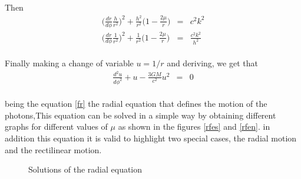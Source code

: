 \documentclass[letterpaper,11pt,onecolumn]{article}
\begin{document}
Then
\begin{eqnarray}
    \Big(\frac{dr}{d\phi}\frac{h}{r^{2}}\Big)^{2}+\frac{h^2}{r^{2}}\Big( 1- \frac{2\mu}{r}\Big)&=& c^{2}k^{2} \nonumber\\
    \Big(\frac{dr}{d\phi}\frac{1}{r^{2}}\Big)^{2}+\frac{1}{r^{2}}\Big( 1- \frac{2\mu}{r}\Big)&=&\frac{c^{2}k^{2}}{h^{2}}\label{aste} 
\end{eqnarray}\\
Finally making a change of variable $u=1/r$ and deriving, we get that
\begin{eqnarray}
    \frac{d^{2}u}{d\phi^{2}}+u-\frac{3GM}{c^{2}}u^{2}&=&0 \label{fr}
\end{eqnarray}\\ 
being the equation \ref{fr} the radial equation that defines the motion of the photons,This equation can be solved in a simple way by obtaining different graphs for different values of $\mu$ as shown in the figures \ref{rfes} and \ref{rfen}. in addition this equation it is valid to highlight two special cases, the radial motion and the rectilinear motion. 
\begin{figure}[h]
\centering
{}
\caption{Solutions of the radial equation}
\end{figure}
\end{document}
